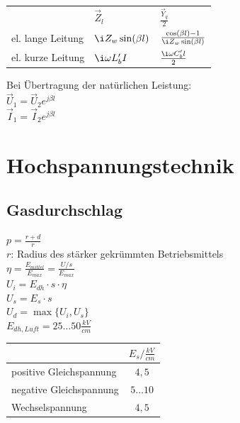 \documentclass[european]{latex4ei_sheet}
\begin{document}
		
		\begin{tabular}{lll}
		& $\vec Z_l$ & $\frac{\vec Y_q}{2}$\\[0.5em] \mrule
		el. lange Leitung & $\i Z_w \sin(\beta l)$ & $\frac{\cos(\beta l) -1}{\i Z_w \sin(\beta l)}$\\[0.5em]
		el. kurze Leitung & $\i \omega L'_b I$ & $\frac{\i \omega C'_b l}{2}$\\[0.5em]
		\end{tabular}
		
		Bei Übertragung der natürlichen Leistung: \\
		$\vec U_1 = \vec U_2 e^{j \beta l}$ \\
		$\vec I_1 = \vec I_2 e^{j \beta l}$ \\


	\section{Hochspannungstechnik}
		\subsection{Gasdurchschlag}
		$p = \frac{r + d}{r}$ \\
		$r$: Radius des stärker gekrümmten Betriebsmittels \\
		$\eta = \frac{E_{mittel}}{E_{max}} = \frac{U/s}{E_{max}}$ \\
		$U_i = E_{dh} \cdot s \cdot \eta$ \\
		$U_s = E_s \cdot s$ \\
		$U_d = \max\{U_i, U_s\}$ \\
		$E_{dh,Luft} = 25 \hdots 50 \frac{kV}{cm}$ \\
		\begin{tabular}{l|c}
		 & $E_s / \frac{kV}{cm}$ \\ \hline
		 positive Gleichspannung & $4,5$ \\ \hline
		 negative Gleichspannung & $5 \hdots 10$ \\ \hline
		 Wechselspannung & $4,5$
		\end{tabular}
\end{document}
